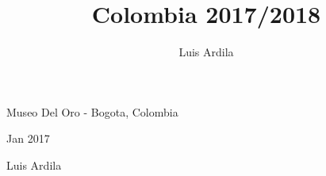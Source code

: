 \documentclass[10pt,final,openany]{book}
\title{Colombia 2017/2018}
\author{Luis Ardila}
\begin{document}
\pagestyle{empty}

\vspace*{5cm}

\begin{center}

{\Huge Museo Del Oro - Bogota, Colombia}

\vspace{\baselineskip}

{\LARGE Jan 2017}

\vspace{\baselineskip}

{\Large Luis Ardila }

\end{center}

\newpage
\thispagestyle{empty}
\mbox{}

\addtocounter{page}{-2}%

\pagestyle{plain}

\captionsetup[figure]{labelformat=empty}

\newpage


\end{document}
